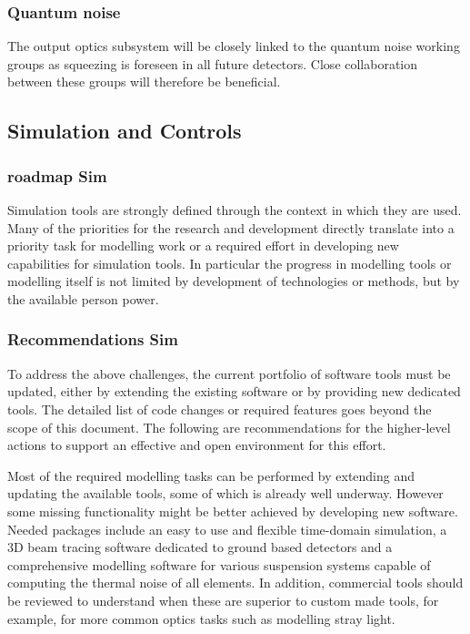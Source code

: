 \subsubsection{\bf Quantum noise} The output optics subsystem will be closely linked to the quantum noise working groups as squeezing is foreseen in all future detectors. Close collaboration between these groups will therefore be beneficial.

\subsection{Simulation and Controls}
\subsubsection{roadmap Sim}
Simulation tools are strongly defined through the context in which they are used. Many of the priorities for the research and development directly translate into a priority task for modelling work or a required effort in developing new capabilities for simulation tools. In particular the progress in modelling tools or modelling itself is not limited by development of technologies or methods, but by the available person power.

\subsubsection{Recommendations Sim}
To address the above challenges, the current portfolio of software tools must be updated, either by extending the existing software or by providing new dedicated tools. The detailed list of code changes or required features goes beyond the scope of this document. The following are recommendations for the higher-level actions to support an effective and open environment for this effort.

Most of the required modelling tasks can be performed by extending and updating the available tools, some of which is already well underway. However some missing functionality might be better achieved by developing new software. Needed packages include an easy to use and flexible time-domain simulation, a 3D beam tracing software dedicated to ground based detectors and a comprehensive modelling software for various suspension systems capable of computing the thermal noise of all elements. In addition, commercial tools should be reviewed to understand when these are superior to custom made tools, for example, for more common optics tasks such as modelling stray light.

